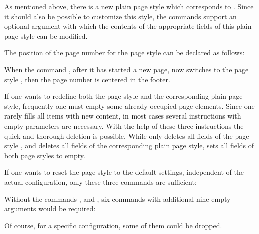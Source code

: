 As mentioned above, there is a new plain page style which corresponds to
. Since it should also be possible to customize this
style, the commands support an optional argument with which the contents of
the appropriate fields of this plain page style can be modified.

\begin{Example}
  The position of the page number for the page style 
  can be declared as follows:
\begin{lstcode}
  \cfoot[\pagemark]{}
  \ohead[]{\pagemark}
\end{lstcode}
  When the command , after it has started a new page, now
  switches to the page style , then the page number is
  centered in the footer.
\end{Example}
%
\EndIndexGroup


\begin{Declaration}
\end{Declaration}%
If one wants to redefine both the page style  and
the corresponding plain page style, frequently one must empty
some already occupied page elements. Since one rarely fills all items
with new content, in most cases several instructions with empty
parameters are necessary.  With the help of these three instructions
the quick and thorough deletion is possible.  While
 only deletes all fields of the page style
, and  deletes all fields of
the corresponding plain page style, 
sets all fields of both page styles to empty.
\begin{Example}
  If one wants to reset the page style to the default {\KOMAScript}
  settings, independent of the actual configuration, only these three
  commands are sufficient:
\begin{lstcode}
  \clearscrheadfoot
  \ohead{\headmark}
  \ofoot[\pagemark]{\pagemark}
\end{lstcode}
  Without the commands ,
   and , six commands with
  additional nine empty arguments would be required:
\begin{lstcode}
  \ihead[]{}
  \chead[]{}
  \ohead[]{\headmark}
  \ifoot[]{}
  \cfoot[]{}
  \ofoot[\pagemark]{\pagemark}
\end{lstcode}
  Of course, for a specific configuration, some of them could be
  dropped.%
\end{Example}%
%
\EndIndexGroup
%
\EndIndexGroup


